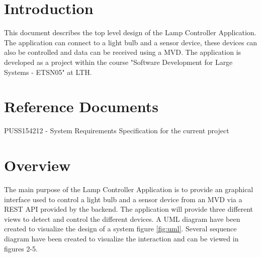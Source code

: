 \documentclass[a4paper]{article}
\begin{document}
	
	\tableofcontents
	\newpage
	
	\section{Introduction}
	This document describes the top level design of the Lamp Controller Application. The application can connect to a light bulb and a sensor device, these devices can also be controlled and data can be received using a MVD. The application is developed as a project within the course "Software Development for Large Systems - ETSN05" at LTH.
	
	\section{Reference Documents}
	PUSS154212 - System Requirements Specification for the current project
	
	
	\section{Overview}
	The main purpose of the Lamp Controller Application is to provide an graphical interface used to control a light bulb and a sensor device from an MVD via a REST API provided by the backend. The application will provide three different views to detect and control the different devices. A UML diagram have been created to visualize the design of a system figure \ref{fig:uml}. Several sequence diagram have been created to visualize the interaction and can be viewed in figures 2-5.
	
\end{document}
